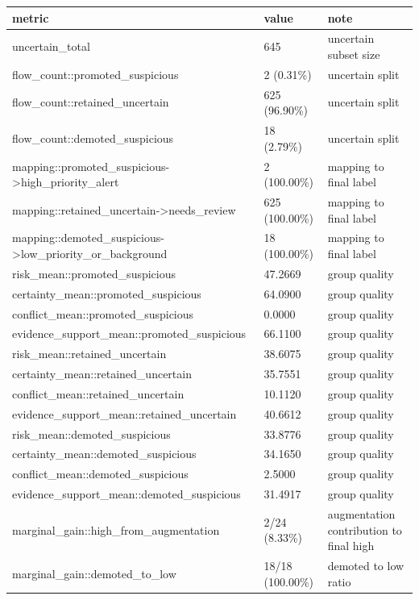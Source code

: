 ﻿\begin{tabular}{|l|l|l|}
\hline
metric & value & note \\
\hline
uncertain\_total & 645 & uncertain subset size \\
\hline
flow\_count::promoted\_suspicious & 2 (0.31\%) & uncertain split \\
\hline
flow\_count::retained\_uncertain & 625 (96.90\%) & uncertain split \\
\hline
flow\_count::demoted\_suspicious & 18 (2.79\%) & uncertain split \\
\hline
mapping::promoted\_suspicious->high\_priority\_alert & 2 (100.00\%) & mapping to final label \\
\hline
mapping::retained\_uncertain->needs\_review & 625 (100.00\%) & mapping to final label \\
\hline
mapping::demoted\_suspicious->low\_priority\_or\_background & 18 (100.00\%) & mapping to final label \\
\hline
risk\_mean::promoted\_suspicious & 47.2669 & group quality \\
\hline
certainty\_mean::promoted\_suspicious & 64.0900 & group quality \\
\hline
conflict\_mean::promoted\_suspicious & 0.0000 & group quality \\
\hline
evidence\_support\_mean::promoted\_suspicious & 66.1100 & group quality \\
\hline
risk\_mean::retained\_uncertain & 38.6075 & group quality \\
\hline
certainty\_mean::retained\_uncertain & 35.7551 & group quality \\
\hline
conflict\_mean::retained\_uncertain & 10.1120 & group quality \\
\hline
evidence\_support\_mean::retained\_uncertain & 40.6612 & group quality \\
\hline
risk\_mean::demoted\_suspicious & 33.8776 & group quality \\
\hline
certainty\_mean::demoted\_suspicious & 34.1650 & group quality \\
\hline
conflict\_mean::demoted\_suspicious & 2.5000 & group quality \\
\hline
evidence\_support\_mean::demoted\_suspicious & 31.4917 & group quality \\
\hline
marginal\_gain::high\_from\_augmentation & 2/24 (8.33\%) & augmentation contribution to final high \\
\hline
marginal\_gain::demoted\_to\_low & 18/18 (100.00\%) & demoted to low ratio \\
\hline
\end{tabular}
